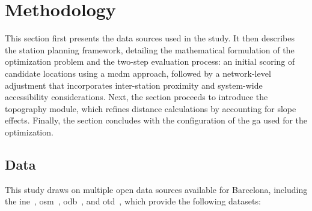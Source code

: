 \section{Methodology}
\label{sec:station_planning_methodology}

This section first presents the data sources used in the study. It then describes the station planning framework, detailing the mathematical formulation of the optimization problem and the two-step evaluation process: an initial scoring of candidate locations using a \ac{mcdm} approach, followed by a network-level adjustment that incorporates inter-station proximity and system-wide accessibility considerations. Next, the section proceeds to introduce the topography module, which refines distance calculations by accounting for slope effects. Finally, the section concludes with the configuration of the \ac{ga} used for the optimization.

    \subsection{Data}
    
    This study draws on multiple open data sources available for Barcelona, including the \acf{ine}~\cite{INE}, \acf{osm}~\cite{OpenStreetMap_web}, \acf{odb}~\cite{ODB}, and \acf{otd}~\cite{OTD}, which provide the following datasets:

